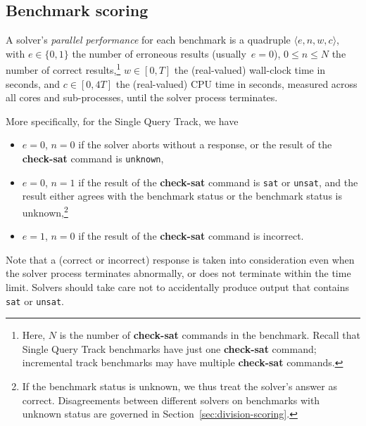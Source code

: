 \documentclass[12pt]{article}
\newcommand{\akey}[1]{\textbf{#1}}
\newcommand{\main}{Single Query\xspace}
\begin{document}
\subsection{Benchmark scoring}
\label{sec:benchmark-scoring}

A solver's \emph{parallel performance} for each benchmark is a quadruple $\langle
e, n, w, c\rangle$, with $e \in \{0, 1\}$ the number of erroneous
results (usually~$e = 0$), $0 \leq n \leq N$ the number of correct
results,\footnote{Here, $N$ is the number of \akey{check-sat} commands
  in the benchmark.  Recall that \main Track benchmarks have just one
  \akey{check-sat} command; incremental track benchmarks may have
  multiple \akey{check-sat} commands.} $w \in [0,T]$ the (real-valued)
wall-clock time in seconds, and $c \in [0, 4T]$ the (real-valued) CPU
time in seconds, measured across all cores and sub-processes, until
the solver process terminates.

\header{\main Track.} More specifically, for the \main Track, we have
%
\begin{itemize}
\item $e=0$, $n=0$ if the solver aborts without a response, or the
  result of the \akey{check-sat} command is \texttt{unknown},
\item $e=0$, $n=1$ if the result of the \akey{check-sat} command is
  \texttt{sat} or \texttt{unsat}, and the result either agrees with
  the benchmark status or the benchmark status is unknown,\footnote{If
    the benchmark status is unknown, we thus treat the solver's answer
    as correct.  Disagreements between different solvers on benchmarks
    with unknown status are governed in
    Section~\ref{sec:division-scoring}.}
\item $e=1$, $n=0$ if the result of the \akey{check-sat} command is
  incorrect.
\end{itemize}
%
Note that a (correct or incorrect) response is taken into
consideration even when the solver process terminates abnormally, or
does not terminate within the time limit.  Solvers should take care
not to accidentally produce output that contains \texttt{sat} or
\texttt{unsat}.
\end{document}
